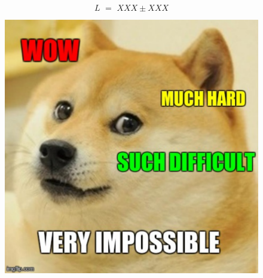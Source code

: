 \begin{equation*}
	L \,\,=\,\, XXX \pm XXX
\end{equation*}

\begin{figure}[hbtp]
        \centering
        \includegraphics[scale=0.43]{doge.pdf}
\end{figure}
